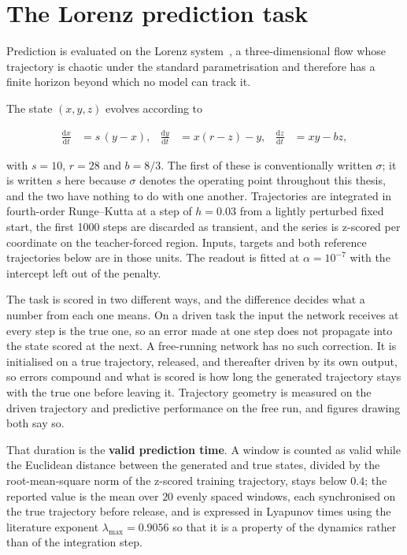 \section{The Lorenz prediction task}
\label{sec:methods-closed-loop}
\bigskip

Prediction is evaluated on the Lorenz system~\cite{lorenz1963deterministic}, a
three-dimensional flow whose trajectory is chaotic under the standard
parametrisation and therefore has a finite horizon beyond which no model can
track it.

The state $(x, y, z)$ evolves according to

\begin{equation}
    \begin{aligned}
        \frac{\mathrm{d}x}{\mathrm{d}t} &= s\,(y - x), &
        \frac{\mathrm{d}y}{\mathrm{d}t} &= x(r - z) - y, &
        \frac{\mathrm{d}z}{\mathrm{d}t} &= xy - b z,
    \end{aligned}
    \label{eq:lorenz_system}
\end{equation}

with $s = 10$, $r = 28$ and $b = 8/3$. The first of these is conventionally
written $\sigma$; it is written $s$ here because $\sigma$ denotes the operating
point throughout this thesis, and the two have nothing to do with one another.
Trajectories are integrated in fourth-order Runge--Kutta at a step of
$h = 0.03$ %
from a lightly perturbed fixed start, the first
1000 steps %
are discarded as transient, and the series is z-scored per coordinate on the
teacher-forced region. Inputs, targets and both reference trajectories below are
in those units. The readout is fitted at
$\alpha = 10^{-7}$ %
with the intercept left out of the penalty.

The task is scored in two different ways, and the difference decides what a
number from each one means. On a driven task the input the network receives at
every step is the true one, so an error made at one step does not propagate into
the state scored at the next. A free-running network has no such correction. It
is initialised on a true trajectory, released, and thereafter driven by its own
output, so errors compound and what is scored is how long the generated
trajectory stays with the true one before leaving it. Trajectory geometry is
measured on the driven trajectory and predictive performance on the free run,
and figures drawing both say so.

That duration is the \textbf{valid prediction time}. A window is counted as
valid while the Euclidean distance between the generated and true states,
divided by the root-mean-square norm of the z-scored training trajectory, stays
below
$0.4$; %
the reported value is the mean over
$20$ %
evenly spaced windows, each synchronised on the true trajectory before release,
and is expressed in Lyapunov times using the literature exponent
$\lambda_{\operatorname{max}} = 0.9056$ %
so that it is a property of the dynamics rather than of the integration step.

